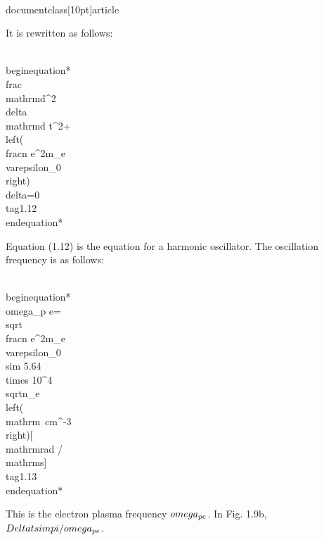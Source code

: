 \\documentclass[10pt]{article}
\begin{document}
It is rewritten as follows:


\\begin{equation*}
\\frac{\\mathrm{d}^{2} \\delta}{\\mathrm{d} t^{2}}+\\left(\\frac{n e^{2}}{m_{e} \\varepsilon_{0}}\\right) \\delta=0 \\tag{1.12}
\\end{equation*}


Equation (1.12) is the equation for a harmonic oscillator. The oscillation frequency is as follows:


\\begin{equation*}
\\omega_{p e}=\\sqrt{\\frac{n e^{2}}{m_{e} \\varepsilon_{0}}} \\sim 5.64 \\times 10^{4} \\sqrt{n_{e}\\left(\\mathrm{~cm}^{-3}\\right)}[\\mathrm{rad} / \\mathrm{s}] \\tag{1.13}
\\end{equation*}


This is the electron plasma frequency $\\omega_{p e}$. In Fig. 1.9b, $\\Delta t \\sim \\pi / \\omega_{p e}$.
\end{document}
